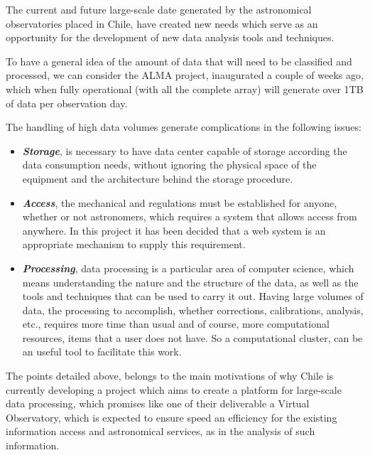 The current and future large-scale date generated by the astronomical observatories
placed in Chile, have created new needs which serve as an opportunity
for the development of new data analysis tools and techniques.


To have a general idea of the amount of data that will need to be classified and
processed, we can consider the ALMA project, inaugurated a couple of weeks ago,
which when fully operational (with all the complete array) will generate over 1TB
of data per observation day.

The handling of high data volumes generate complications in the following
issues:

\begin{itemize}
    \item \emph{\textbf{Storage}}, is necessary to have data center
        capable of storage according the data consumption needs,
        without ignoring the physical space of the equipment and
        the architecture behind the storage procedure.
    \item \emph{\textbf{Access}}, the mechanical and regulations must be
        established for anyone, whether or not astronomers, which
        requires a system that allows access from anywhere.
        In this project it has been decided that a web system is an
        appropriate mechanism to supply this requirement.
    \item \emph{\textbf{Processing}}, data processing is a particular area
        of computer science, which means understanding the nature and the
        structure of the data, as well as the tools and techniques
        that can be used to carry it out. Having large volumes of data,
        the processing to accomplish, whether corrections, calibrations,
        analysis, etc., requires more time than usual and of course,
        more computational resources, items that a user does not have.
        So a computational cluster, can be an useful tool to facilitate
        this work.
\end{itemize}

The points detailed above, belongs to the main motivations of why Chile is currently
developing a project which aims to create a platform for large-scale data processing,
which promises like one of their deliverable a Virtual Observatory,
which is expected to ensure speed an efficiency for the existing information access
and astronomical services, as in the analysis of such information.

